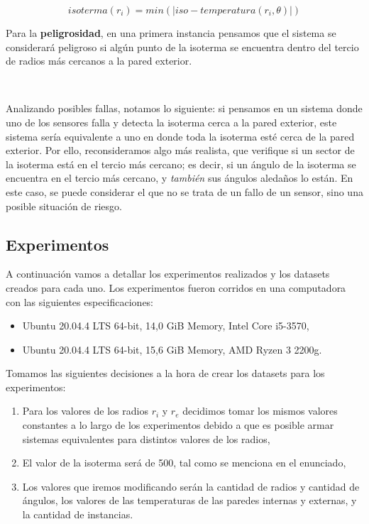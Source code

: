 \begin{equation}\label{ecuacion_isoterma}
     isoterma(r_{i})  = min(|iso - temperatura(r_{i}, \theta)|)
\end{equation}

Para la \textbf{peligrosidad}, en una primera instancia pensamos que el sistema se considerará peligroso si algún punto de la isoterma se encuentra dentro del tercio de radios más cercanos a la pared exterior. 

\

Analizando posibles fallas, notamos lo siguiente: si pensamos en un sistema donde uno de los sensores falla y detecta la isoterma cerca a la pared exterior, este sistema sería equivalente a uno en donde toda la isoterma esté cerca de la pared exterior. Por ello, reconsideramos algo más realista, que verifique si un sector de la isoterma está en el tercio más cercano; es decir, si un ángulo de la isoterma se encuentra en el tercio más cercano, y \emph{también} sus ángulos aledaños lo están. En este caso, se puede considerar el que no se trata de un fallo de un sensor, sino una posible situación de riesgo.

\subsection{Experimentos}

A continuación vamos a detallar los experimentos realizados y los datasets creados para cada uno. Los experimentos fueron corridos en una computadora con las siguientes especificaciones: 

\begin{itemize}
    \item Ubuntu 20.04.4 LTS 64-bit, 14,0 GiB Memory, Intel Core i5-3570,
    \item Ubuntu 20.04.4 LTS 64-bit, 15,6 GiB Memory, AMD Ryzen 3 2200g.
\end{itemize}

Tomamos las siguientes decisiones a la hora de crear los datasets para los experimentos:
\begin{enumerate}
    \item Para los valores de los radios $r_i$ y $r_e$ decidimos tomar los mismos valores constantes a lo largo de los experimentos debido a que es posible armar sistemas equivalentes para distintos valores de los radios, 
    \item El valor de la isoterma será de 500, tal como se menciona en el enunciado,
    \item Los valores que iremos modificando serán la cantidad de radios y cantidad de ángulos, los valores de las temperaturas de las paredes internas y externas, y la cantidad de instancias.    
\end{enumerate}

